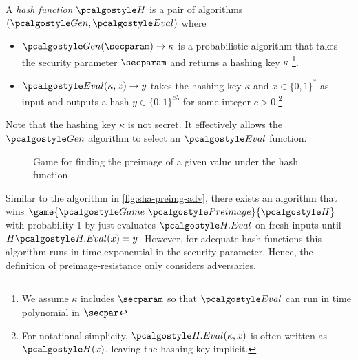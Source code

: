 \begin{definition}
  A \emph{hash function} $\algo{H}$ is a pair of \ppt algorithms $(\algo{Gen}, \algo{Eval})$ where
  \begin{itemize}
  \item $\algo{Gen}(\secparam) \rightarrow \kappa$ is a probabilistic algorithm that takes the security parameter $\secparam$ and returns a hashing key $\kappa$ \footnote{We assume $\kappa$ includes $\secparam$ so that $\algo{Eval}$ can run in time polynomial in $\secpar$}.
  \item $\algo{Eval}(\kappa, x) \rightarrow y$ takes the hashing key $\kappa$ and $x\in \{0,1\}^*$ as input and outputs a hash $y\in \{0,1\}^{c\lambda}$ for some integer $c > 0$.\footnote{For notational simplicity, $\algo{H.Eval}(\kappa, x)$ is often written as $\algo{H}(x)$, leaving the hashing key implicit.}
  \end{itemize}
\end{definition}

Note that the hashing key $\kappa$ is not secret.
It effectively allows the $\algo{Gen}$ algorithm to select an $\algo{Eval}$ function.

\begin{figure}[tbhp]
  \begin{center}
    \begin{tcolorbox}[width=5cm]
      \begin{pchstack}[center]
      \end{pchstack}
    \end{tcolorbox}
  \end{center}
  \caption{Game for finding the preimage of a given value under the hash function \label{fig:break-hash}}
\end{figure}

Similar to the algorithm in \autoref{fig:sha-preimg-adv}, there exists an algorithm that wins $\game{\Game~\algo{Preimage}}{\algo{H}}$ with probability 1 by just evaluates $\algo{H.Eval}$ on fresh inputs until $H\algo{H.Eval}(x) = y$.
However, for adequate hash functions this algorithm runs in time exponential in the security parameter.
Hence, the definition of preimage-resistance only considers \ppt adversaries.


